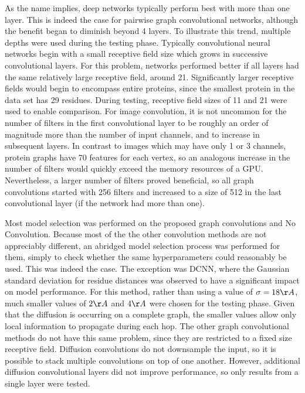 As the name implies, deep networks typically perform best with more than one layer. 
This is indeed the case for pairwise graph convolutional networks, although the benefit began to diminish beyond 4 layers.
To illustrate this trend, multiple depths were used during the testing phase.
Typically convolutional neural networks begin with a small receptive field size which grows in successive convolutional layers.
For this problem, networks performed better if all layers had the same relatively large receptive field, around 21. 
Significantly larger receptive fields would begin to encompass entire proteins, since the smallest protein in the data set has 29 residues.
During testing, receptive field sizes of 11 and 21 were used to enable comparison.
For image convolution, it is not uncommon for the number of filters in the first convolutional layer to be roughly an order of magnitude more than the number of input channels, and to increase in subsequent layers.
In contrast to images which may have only 1 or 3 channels, protein graphs have 70 features for each vertex, so an analogous increase in the number of filters would quickly exceed the memory resources of a GPU.
Nevertheless, a larger number of filters proved beneficial, so all graph convolutions started with 256 filters and increased to a size of 512 in the last convolutional layer (if the network had more than one).


Most model selection was performed on the proposed graph convolutions and No Convolution.
Because most of the the other convolution methods are not appreciably different, an abridged model selection process was performed for them, simply to check whether the same hyperparameters could reasonably be used.
This was indeed the case.
The exception was DCNN, where the Gaussian standard deviation for residue distances was observed to have a significant impact on model performance. 
For this method, rather than using a value of $\sigma = 18\AA{}$, much smaller values of $2\AA{}$ and $4\AA{}$ were chosen for the testing phase.
Given that the diffusion is occurring on a complete graph, the smaller values allow only local information to propagate during each hop.
The other graph convolutional methods do not have this same problem, since they are restricted to a fixed size receptive field. 
Diffusion convolutions do not downsample the input, so it is possible to stack multiple convolutions on top of one another.
However, additional diffusion convolutional layers did not improve performance, so only results from a single layer were tested.

